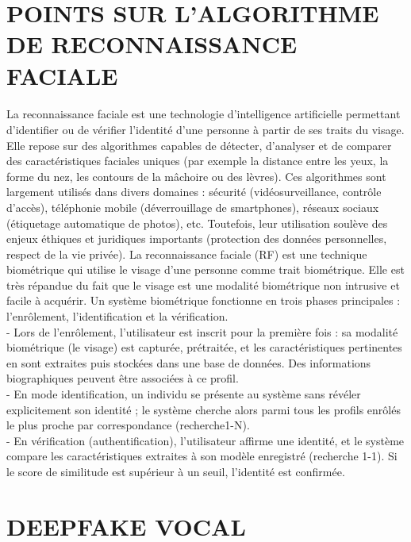 \documentclass[]{article}
\begin{document}
\section{POINTS SUR L’ALGORITHME DE RECONNAISSANCE FACIALE}
\paragraph{}
La reconnaissance faciale est une technologie d'intelligence artificielle permettant d'identifier ou de vérifier l'identité d'une personne à partir de ses traits du visage. Elle repose sur des algorithmes capables de détecter, d'analyser et de comparer des caractéristiques faciales uniques (par exemple la distance entre les yeux, la forme du nez, les contours de la mâchoire ou des lèvres). Ces algorithmes sont largement utilisés dans divers domaines : sécurité (vidéosurveillance, contrôle d'accès), téléphonie mobile (déverrouillage de smartphones), réseaux sociaux (étiquetage automatique de photos), etc. Toutefois, leur utilisation soulève des enjeux éthiques et juridiques importants (protection des données personnelles, respect de la vie privée). La reconnaissance faciale (RF) est une technique biométrique qui utilise le visage d'une personne comme trait biométrique. Elle est très répandue du fait que le visage est une modalité biométrique non intrusive et facile à acquérir. Un système biométrique fonctionne en trois phases principales : l'enrôlement, l'identification et la vérification.\\ 
-	Lors de l'enrôlement, l'utilisateur est inscrit pour la première fois : sa modalité biométrique (le visage) est capturée, prétraitée, et les caractéristiques pertinentes en sont extraites puis stockées dans une base de données. Des informations biographiques peuvent être associées à ce profil.\\ 
-	En mode identification, un individu se présente au système sans révéler explicitement son identité ; le système cherche alors parmi tous les profils enrôlés le plus proche par correspondance (recherche1-N).\\
-	En vérification (authentification), l'utilisateur affirme une identité, et le système compare les caractéristiques extraites à son modèle enregistré (recherche 1-1). Si le score de similitude est supérieur à un seuil, l'identité est confirmée.\\

\section{DEEPFAKE VOCAL}
\end{document}
